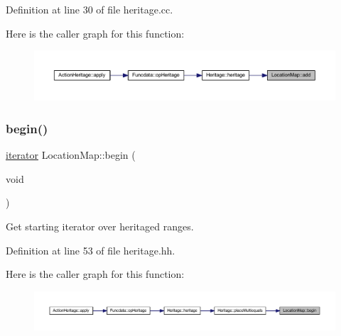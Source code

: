 Definition at line 30 of file heritage.\+cc.

Here is the caller graph for this function\+:
\nopagebreak
\begin{figure}[H]
\begin{center}
\leavevmode
\includegraphics[width=350pt]{class_location_map_a72014909f852e240636856c3fec0ca04_icgraph}
\end{center}
\end{figure}
\mbox{\label{class_location_map_ae639047ed4f014b5a05511a65e886398}} 
\subsubsection{\texorpdfstring{begin()}{begin()}}
{\footnotesize\ttfamily \mbox{\hyperlink{class_location_map_a13612b4d0583b85205f3ad6476c2aef9}{iterator}} Location\+Map\+::begin (\begin{DoxyParamCaption}\item[{void}]{ }\end{DoxyParamCaption})\hspace{0.3cm}{\ttfamily [inline]}}



Get starting iterator over heritaged ranges. 



Definition at line 53 of file heritage.\+hh.

Here is the caller graph for this function\+:
\nopagebreak
\begin{figure}[H]
\begin{center}
\leavevmode
\includegraphics[width=350pt]{class_location_map_ae639047ed4f014b5a05511a65e886398_icgraph}
\end{center}
\end{figure}
\mbox{\label{class_location_map_a76bf666b4ad4b511cfd0290b9b04aa72}} 
